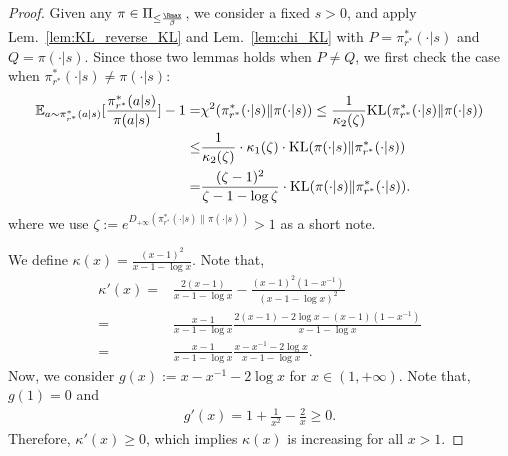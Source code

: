 \begin{proof}
    Given any $\pi \in \Pi_{\leq\frac{\Rmax}{\beta}}$, we consider a fixed $s > 0$, and apply Lem.~\ref{lem:KL_reverse_KL} and Lem.~\ref{lem:chi_KL} with $P = \pi^*_{r^*}(\cdot|s)$ and $Q = \pi(\cdot|s)$. Since those two lemmas holds when $P \neq Q$, we first check the case when $\pi^*_{r^*}(\cdot|s) \neq \pi(\cdot|s)$:
    \begin{align*}
        \mathbb{E}_{a\sim\pi^*_{r^*}(a|s)}[\frac{\pi^*_{r^*}(a|s)}{\pi(a|s)}] - 1 =& \chi^2(\pi^*_{r^*}(\cdot|s)\|\pi(\cdot|s)) \leq \frac{1}{\kappa_2(\zeta)} \text{KL}(\pi^*_{r^*}(\cdot|s)\|\pi(\cdot|s)) \\
        \leq & \frac{1}{\kappa_2(\zeta)} \cdot \kappa_1(\zeta) \cdot \text{KL}(\pi(\cdot|s)\|\pi^*_{r^*}(\cdot|s)) \\
        =& \frac{(\zeta - 1)^2}{\zeta - 1 - \log \zeta} \cdot \text{KL}(\pi(\cdot|s)\|\pi^*_{r^*}(\cdot|s)).
    \end{align*}
    where we use $\zeta := e^{D_{+\infty}(\pi^*_{r^*}(\cdot|s)\|\pi(\cdot|s))} > 1$ as a short note.

    We define $\kappa(x) = \frac{(x - 1)^2}{x - 1 - \log x}$. Note that,
    \begin{align*}
        \kappa'(x) =& \frac{2(x - 1)}{x - 1 - \log x} - \frac{(x - 1)^2(1 - x^{-1})}{(x - 1 - \log x)^2} \\
        =&\frac{x - 1}{x - 1 - \log x} \frac{2(x - 1) - 2\log x - (x - 1)(1 - x^{-1})}{x - 1 - \log x} \\
        =&\frac{x - 1}{x - 1 - \log x} \frac{x - x^{-1} - 2\log x }{x - 1 - \log x}.
    \end{align*}
    Now, we consider $g(x) := x - x^{-1} - 2\log x$ for $x \in (1, +\infty)$. Note that, $g(1) = 0$ and
    \begin{align*}
        g'(x) = 1 + \frac{1}{x^2} - \frac{2}{x} \geq 0.
    \end{align*}
    Therefore, $\kappa'(x) \geq 0$, which implies $\kappa(x)$ is increasing for all $x > 1$.




\end{proof}
